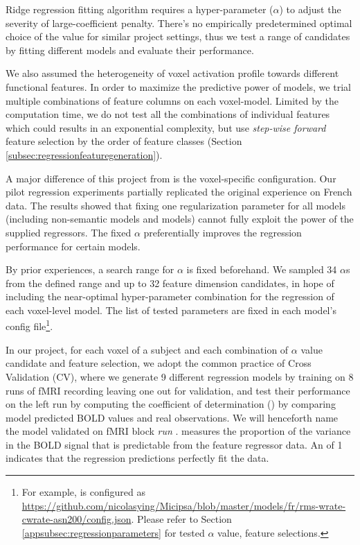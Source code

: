 Ridge regression fitting algorithm requires a hyper-parameter (\(\alpha\)) to adjust the severity of large-coefficient penalty. There's no empirically predetermined optimal choice of the value for similar project settings, thus we test a range of candidates by fitting different models and evaluate their performance. 

We also assumed the heterogeneity of voxel activation profile towards different functional features. In order to maximize the predictive power of models, we trial multiple combinations of feature columns on each voxel-model. Limited by the computation time, we do not test all the combinations of individual features which could results in an exponential complexity, but use \emph{step-wise forward} feature selection by the order of feature classes (Section \ref{subsec:regressionfeaturegeneration}). 

A major difference of this project from \textcite{todorovicAnalysesIRMfLors2018, verdierEncodageActiviteNeuronale2018} is the voxel-specific configuration. Our pilot regression experiments partially replicated the original experience \parencite{todorovicAnalysesIRMfLors2018} on French data. The results showed that fixing one regularization parameter for all models (including non-semantic models and  models) cannot fully exploit the power of the supplied regressors. The fixed \(\alpha\) preferentially improves the regression performance for certain models. 

By prior experiences, a search range for \(\alpha\) is fixed beforehand. We sampled 34 \(\alpha\)s from the defined range and up to 32 feature dimension candidates, in hope of including the near-optimal hyper-parameter combination for the regression of each voxel-level model. The list of tested parameters are fixed in each model's config file\footnote{For example,  is configured as \url{https://github.com/nicolasying/Micipsa/blob/master/models/fr/rms-wrate-cwrate-asn200/config.json}. Please refer to Section \ref{appsubsec:regressionparameters} for tested \(\alpha\) value, feature selections.}.

In our project, for each voxel of a subject and each combination of \(\alpha\) value candidate and feature selection, we adopt the common practice of Cross Validation (CV), where we generate 9 different regression models by training on 8 runs of fMRI recording leaving one out for validation, and test their performance on the left run by computing the coefficient of determination () by comparing model predicted BOLD values and real observations. We will henceforth name the model validated on fMRI block  \emph{run} .  measures the proportion of the variance in the BOLD signal that is predictable from the feature regressor data. An  of 1 indicates that the regression predictions perfectly fit the data.

